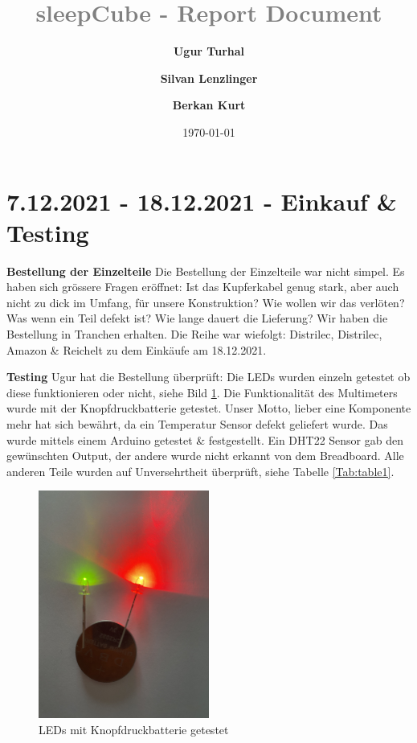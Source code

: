 \documentclass[12pt]{article}
\title{\textcolor{gray}{\textbf{sleepCube - Report Document}\\[0.2cm]}}
\author[1]{\fontsize{9}{9} \textbf{Ugur Turhal}}
\author[2]{\textbf{Silvan Lenzlinger}}
\author[1]{\textbf{Berkan Kurt}}
\affil[1]{\fontsize{8}{8}\href{mailto:ugur.turhal@me.com}{ugur.turhal@me.com}}
\affil[2]{test}
\affil[3]{test}
\date{\today}
\begin{document}
\maketitle

\section{7.12.2021 - 18.12.2021 - Einkauf \& Testing}
\justifying

\textbf{Bestellung der Einzelteile} 
Die Bestellung der Einzelteile war nicht simpel. Es haben sich grössere Fragen eröffnet: Ist das Kupferkabel genug stark, aber auch nicht zu dick im Umfang, für unsere Konstruktion? Wie wollen wir das verlöten? Was wenn ein Teil defekt ist? Wie lange dauert die Lieferung? Wir haben die Bestellung in Tranchen erhalten. Die Reihe war wiefolgt: Distrilec, Distrilec, Amazon \& Reichelt zu dem Einkäufe am 18.12.2021. \par \textbf{Testing} Ugur hat die Bestellung überprüft: Die LEDs wurden einzeln getestet ob diese funktionieren oder nicht, siehe Bild \ref{Fig:leds}. Die Funktionalität des Multimeters wurde mit der Knopfdruckbatterie getestet. Unser Motto, \glqq lieber eine Komponente mehr\grqq\text{ } hat sich bewährt, da ein Temperatur Sensor defekt geliefert wurde. Das wurde mittels einem Arduino getestet \& festgestellt. Ein DHT22 Sensor gab den gewünschten Output, der andere wurde nicht erkannt von dem Breadboard. Alle anderen Teile wurden auf Unversehrtheit überprüft, siehe Tabelle \ref{Tab:table1}.
\begin{figure}[h]
\begin{center}
\includegraphics[width=0.5\textwidth]{pics/leds.jpeg}
\caption{LEDs mit Knopfdruckbatterie getestet}
\label{Fig:leds}
\end{center}
\end{figure}\par
\end{document}
